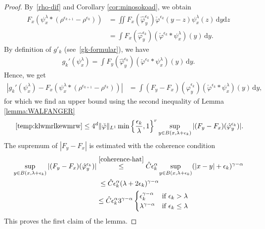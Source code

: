 \begin{itemize}
    \begin{proof}
        By~\eqref{rho-dif} and Corollary \ref{cor:minosokoad}, we obtain 
        \begin{align*}
            F_x(\psi^\lambda_x * (\rho^{\epsilon_{k+1}} - \rho^{\epsilon_k})) &= \iint F_x(\hat \varphi^{\epsilon_k}_y) \check \varphi^{\epsilon_k}(y-z) \psi^{\lambda}_x(z) \, \mathrm{d}y \mathrm{d}z\\
             &= \int F_x(\hat \varphi^{\epsilon_k}_y) ( \check\varphi^{\epsilon_k} * \psi^{\lambda}_x)(y) \, \mathrm{d}y.
        \end{align*}
        By definition of \(g'_k\) (see~\eqref{gk-formular}), we have 
        \begin{align*}
            g_k'(\psi^\lambda_x) = \int F_y(\hat \varphi^{\epsilon_k}_y) (\check \varphi^{\epsilon_k}* \psi^\lambda_x)(y) \, \mathrm{d}y.
        \end{align*}
        Hence, we get
        \begin{align}\label{temp:klwmrlkewmrw}
            |g_k'(\psi^\lambda_x) - F_x(\psi^\lambda_x * (\rho^{\epsilon_{k+1}} - \rho^{\epsilon_k}))| 
            &= \int (F_y-F_x)(\hat \varphi^{\epsilon_k}_y) (\check \varphi^{\epsilon_k}* \psi^\lambda_x)(y) \, \mathrm{d}y,
        \end{align}
        for which we find an upper bound using the second inequality of Lemma \ref{lemma:WALFANGER}
        \begin{align*}
           ~\eqref{temp:klwmrlkewmrw} \leq 4^d \lVert \check \varphi \rVert_{L^1} \min \left\{ \frac{\epsilon_k}{\lambda}, 1 \right\}^r \sup_{y \in B(x, \lambda + \epsilon_k)} |(F_y - F_x)(\hat \varphi_y^{\epsilon_k})|.
        \end{align*}
        The supremum of \(|F_y-F_x|\) is estimated with the coherence condition
        \begin{align*}
            \sup_{y \in B(x, \lambda + \epsilon_k)} |(F_y - F_x)(\hat \varphi^{\epsilon_k}_y)| &\overset{\eqref{coherence-hat}}{\leq} \hat C \epsilon_k^{\alpha} \sup_{y \in B(x, \lambda + \epsilon_k)} (|x - y| + \epsilon_k )^{\gamma - \alpha} \\
            &\;\leq \hat C \epsilon^\alpha_k(\lambda + 2\epsilon_k)^{\gamma - \alpha} \\
            &\leq \hat C \epsilon^\alpha_k 3^{\gamma - \alpha} \begin{cases}
                \epsilon_k^{\gamma - \alpha} &\text{if \(\epsilon_k > \lambda\) } \\
                \lambda^{\gamma - \alpha} &\text{if \(\epsilon_k \leq \lambda\) }
            \end{cases}
        \end{align*}
        This proves the first claim of the lemma.


\end{proof}
\end{itemize}
